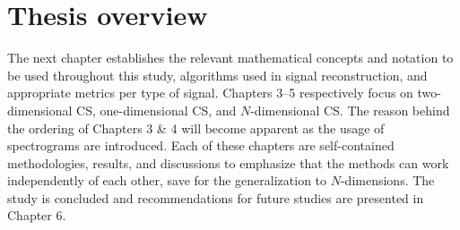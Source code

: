 \section{Thesis overview}
\label{sec:overview}
The next chapter establishes the relevant mathematical concepts and notation to be used throughout this study, algorithms used in signal reconstruction, and appropriate metrics per type of signal. Chapters 3--5 respectively focus on two-dimensional CS, one-dimensional CS, and $N$-dimensional CS. The reason behind the ordering of Chapters 3 \& 4 will become apparent as the usage of spectrograms are introduced. Each of these chapters are self-contained methodologies, results, and discussions to emphasize that the methods can work independently of each other, save for the generalization to $N$-dimensions. The study is concluded and recommendations for future studies are presented in Chapter 6.
